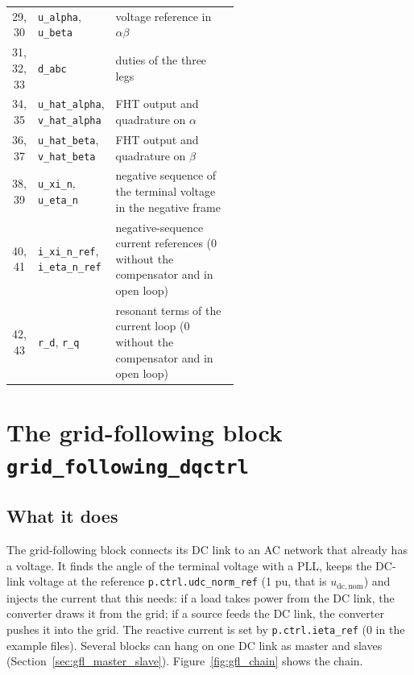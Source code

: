 \documentclass[11pt,a4paper]{scrartcl}
\newcommand{\ped}[1]{_{\mathrm{#1}}}
\newcommand{\code}[1]{\texttt{#1}}
\begin{document}
\begin{onehalfspace}
\begin{longtable}{@{} c l p{0.56\linewidth} @{}}
	29, 30 & \code{u\_alpha}, \code{u\_beta} & voltage reference in $\alpha\beta$ \\
	31, 32, 33 & \code{d\_abc} & duties of the three legs \\
	34, 35 & \code{u\_hat\_alpha}, \code{v\_hat\_alpha} & FHT output and quadrature on $\alpha$ \\
	36, 37 & \code{u\_hat\_beta}, \code{v\_hat\_beta} & FHT output and quadrature on $\beta$ \\
	38, 39 & \code{u\_xi\_n}, \code{u\_eta\_n} & negative sequence of the terminal voltage in the negative frame \\
	40, 41 & \code{i\_xi\_n\_ref}, \code{i\_eta\_n\_ref} & negative-sequence current references (0 without the compensator and in open loop) \\
	42, 43 & \code{r\_d}, \code{r\_q} & resonant terms of the current loop (0 without the compensator and in open loop) \\
\end{longtable}
\normalsize
{}

\section{The grid-following block \code{grid\_following\_dqctrl}}
\label{sec:gfl}

\subsection{What it does}
\label{sec:gfl_purpose}

The grid-following block connects its DC link to an AC network that already has a voltage. It finds the angle of the terminal voltage with a PLL, keeps the DC-link voltage at the reference \code{p.ctrl.udc\_norm\_ref} (1 pu, that is $u\ped{dc,nom}$) and injects the current that this needs: if a load takes power from the DC link, the converter draws it from the grid; if a source feeds the DC link, the converter pushes it into the grid. The reactive current is set by \code{p.ctrl.ieta\_ref} (0 in the example files). Several blocks can hang on one DC link as master and slaves (Section~\ref{sec:gfl_master_slave}). Figure~\ref{fig:gfl_chain} shows the chain.


\end{onehalfspace}
\end{document}
